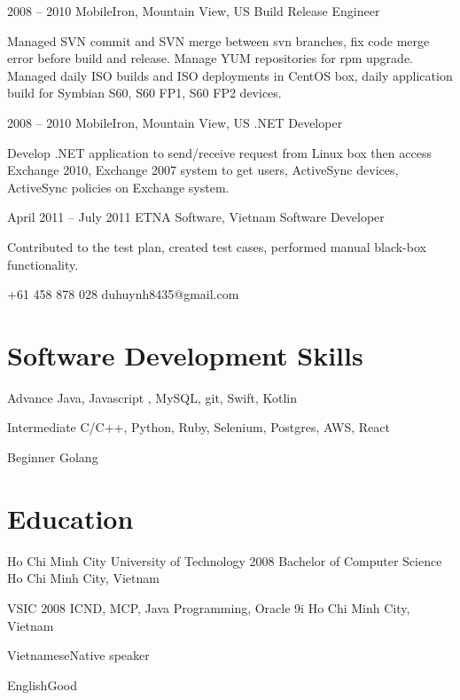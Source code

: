 \documentclass{tccv}
\begin{document}
\begin{eventlist}
\item{2008 -- 2010}
     {MobileIron, Mountain View, US}
     {Build Release Engineer}

Managed SVN commit and SVN merge between svn branches,
  fix code merge error before build and release.
\newline Manage YUM repositories for rpm upgrade.
\newline Managed daily ISO builds and ISO deployments in CentOS box,
  daily application build for Symbian S60, S60 FP1, S60 FP2 devices.

\item{2008 -- 2010}
     {MobileIron, Mountain View, US}
     {.NET Developer}

Develop .NET application to send/receive request from
  Linux box then access Exchange 2010, Exchange 2007
  system to get users, ActiveSync devices, ActiveSync
  policies on Exchange system.

\item{April 2011 -- July 2011}
     {ETNA Software, Vietnam}
     {Software Developer}

Contributed to the test plan, created test cases, performed manual black-box functionality.

\end{eventlist}

    {+61 458 878 028}
    {duhuynh8435@gmail.com}
 

\section{Software Development Skills}

\begin{factlist}

\item{Advance}
     {Java, Javascript , MySQL, git, Swift, Kotlin}

\item{Intermediate}
     {C/C++, Python, Ruby, Selenium, Postgres, AWS, React}

\item{Beginner}
     {Golang}
\end{factlist}

\section{Education}

\begin{yearlist}

\item[Ho Chi Minh City University of Technology]{2008}
     {Bachelor of Computer Science}
     {Ho Chi Minh City, Vietnam}

\item[VSIC]{2008}
     {ICND, MCP, Java Programming, Oracle 9i}
     {Ho Chi Minh City, Vietnam}

\end{yearlist}

\begin{factlist}
\item{Vietnamese}{Native speaker}
\item{English}{Good}
\end{factlist}
\end{document}
